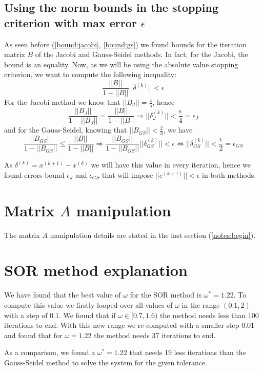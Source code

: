 \documentclass[12pt]{article}
\begin{document}
\subsection{Using the norm bounds in the stopping criterion with max error $\epsilon$}

As seen before (\ref{bound:jacobi}, \ref{bound:gs}) we found bounds for the iteration matrix $B$ of the Jacobi and Gauss-Seidel methods.
In fact, for the Jacobi, the bound is an equality.
Now, as we will be using the absolute value stopping criterion, we want to compute the following inequality:
$$
\frac{||B||}{1 - ||B||}||\delta^{(k)}|| < \epsilon
$$
For the Jacobi method we know that $||B_J|| = \frac{4}{5}$, hence
$$
\frac{||B_J||}{1 - ||B_J||} =
\frac{||B||}{1 - ||B||} \Rightarrow
||\delta_{J}^{(k)}|| < \frac{\epsilon}{4} = \epsilon_J
$$
and for the Gauss-Seidel, knowing that $||B_{GS}|| < \frac{2}{3}$, we have
$$
\frac{||B_{GS}||}{1 - ||B_{GS}||} \leq 
\frac{||B||}{1 - ||B||} \Rightarrow
\frac{||B_{GS}||}{1 - ||B_{GS}||}||\delta_{GS}^{(k)}|| < \epsilon
\iff
||\delta_{GS}^{(k)}|| < \frac{\epsilon}{2} = \epsilon_{GS}
$$

As $\delta^{(k)} = x^{(k+1)} - x^{(k)}$ we will have this value in every iteration, hence we found errors bound $\epsilon_J$ and $\epsilon_{GS}$ that will impose $||e^{(k+1)}|| < \epsilon$ in both methods.

\section{Matrix $A$ manipulation}

The matrix $A$ manipulation details are stated in the last section (\ref{notes:begin}).

\section{SOR method explanation}

We have found that the best value of $\omega$ for the SOR method is $\omega^* = 1.22$.
To compute this value we firstly looped over all values of $\omega$ in the range $(0.1, 2)$ with a 
step of 0.1.
We found that if $\omega \in [0.7, 1.6)$ the method needs less than 100 iterations to end.
With this new range we re-computed with a smaller step 0.01 and found that for $\omega = 1.22$ the method needs 37 iterations to end.

As a comparison, we found a $\omega^* = 1.22$ that needs 19 less iterations than the Gauss-Seidel method to solve the system for the given tolerance. 
\end{document}
